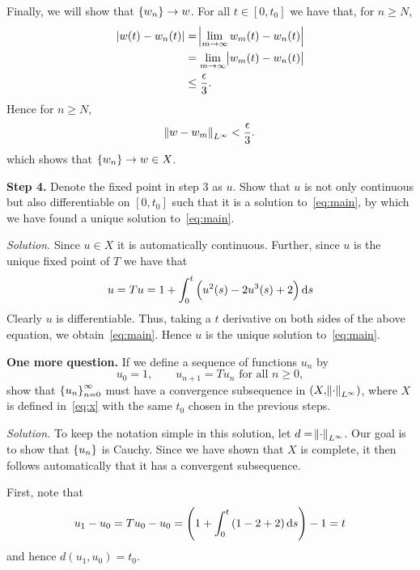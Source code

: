 \documentclass{article}
\begin{document}
Finally, we will show that $\cbr{w_n} \to w$. For all $t \in [0, t_0]$
we have that, for $n \geq N$,
%
\begin{align*}
    |w(t) - w_n(t)|
        &= \envert[2]{\lim_{m \to \infty} w_m(t) - w_n(t)} \\
        &= \lim_{m \to \infty} \envert{w_m(t) - w_n(t)} \\
        &\leq \frac{\epsilon}{3}
    .
\end{align*}
%
Hence for $n \geq N$,
%
\begin{equation*}
    \norm{w - w_m}_{L^\infty} < \frac{\epsilon}{3}
    .
\end{equation*}
%
which shows that $\cbr{w_n} \to w \in X$.

\newpage

\textbf{Step 4.}
Denote the fixed point in step 3 as $u$. Show that $u$ is not only
continuous but also differentiable on $[0, t_0]$ such that it is a
solution to~\eqref{eq:main}, by which we have found a unique solution
to~\eqref{eq:main}.

\textit{Solution.}
Since $u \in X$ it is automatically continuous. Further, since $u$ is
the unique fixed point of $T$ we have that
%
\begin{equation*}
    u = T u = 1 + \int_0^t \del{u^2(s) - 2 u^3(s) + 2} \dif s
\end{equation*}
%
Clearly $u$ is differentiable. Thus, taking a $t$ derivative on both
sides of the above equation, we obtain~\eqref{eq:main}. Hence $u$ is the
unique solution to~\eqref{eq:main}.

\newpage

\textbf{One more question.}
If we define a sequence of functions $u_n$ by
%
\begin{equation*}
   u_0 = 1, \qquad u_{n+1} = Tu_n \text{ for all $n \geq 0$}
   ,
\end{equation*}
%
show that $\cbr{u_n}_{n = 0}^\infty$ must have a convergence subsequence
in $(X, \norm{\cdot}_{L^\infty})$, where $X$ is defined
in~\eqref{eq:x} with the same $t_0$ chosen in the previous steps.

\textit{Solution.}
To keep the notation simple in this solution, let $d =
\norm{\cdot}_{L^\infty}$. Our goal is to show that $\cbr{u_n}$ is
Cauchy. Since we have shown that $X$ is complete, it then follows
automatically that it has a convergent subsequence.

First, note that
%
\begin{equation*}
    u_1 - u_0 = T u_0 -  u_0 = \del{1 + \int_0^t \del{1 - 2 + 2} \dif s} - 1 = t
\end{equation*}
%
and hence $d(u_1, u_0) = t_0$.
\end{document}
